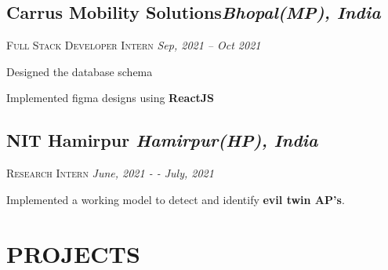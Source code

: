 \documentclass[11pt]{article}
\begin{document}
\subsection*{Carrus Mobility Solutions\hfill \normalsize \normalfont \textit{Bhopal(MP), India}}
\vspace{-1ex}
\textsc{\textmd{Full Stack Developer Intern}} \hfill \normalsize \textit{Sep, 2021 -- Oct 2021}
\vspace{-1ex}

\begin{description}
\setlength{\itemindent}{2\parindent}
\setlength{\itemsep}{0em}
\item[$\bullet$]{Designed the database schema}
\item[$\bullet$]{Implemented figma designs using \textbf{ReactJS}}
\end{description}

\subsection*{NIT Hamirpur \hfill \normalsize \normalfont \textit{Hamirpur(HP), India}}
\vspace{-1ex}
\textsc{\textmd{Research Intern}} \hfill \normalsize \textit{June, 2021 - - July, 2021}
\vspace{-1ex}

\begin{description}
\setlength{\itemindent}{2\parindent}
\setlength{\itemsep}{0em}
\item[$\bullet$]{Implemented a working model to detect and identify \textbf{evil twin AP's}.}
\end{description}


\section{PROJECTS}

\end{document}
